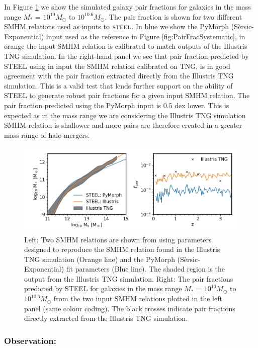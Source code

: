 In Figure \ref{fig:PairFractionIll} we show the simulated galaxy pair fractions for galaxies in the mass range $M_*$ = $10^{10}M_{\odot}$ to $10^{10.6}M_{\odot}$. The pair fraction is shown for two different SMHM relations used as inputs to $\textsc{steel}$. In blue we show the PyMorph (S\`ersic-Exponential) input used as the reference in Figure \ref{fig:PairFracSystematic}, in orange the input SMHM relation is calibrated to match outputs of the Illustris TNG simulation. In the right-hand panel we see that pair fraction predicted by STEEL using in input the SMHM relation calibrated on TNG, is in good agreement with the pair fraction extracted directly from the Illustris TNG simulation. This is a valid test that lends further support on the ability of STEEL to generate robust pair fractions for a given input SMHM relation. The pair fraction predicted using the PyMorph input is 0.5 dex lower. This is expected as in the mass range we are considering the Illustris TNG simulation SMHM relation is shallower and more pairs are therefore created in a greater mass range of halo mergers. 
\begin{figure}
	\centering
	\includegraphics[width = \linewidth]{Figures/Chapter5/PairFractionIllustris.png}
    \caption{Left: Two SMHM relations are shown from \steel using parameters designed to reproduce the SMHM relation found in the Illustris TNG simulation (Orange line) and the PyMorph (S\`ersic-Exponential) fit parameters (Blue line). The shaded region is the output from the Illustris TNG simulation. Right: The pair fractions predicted by STEEL for galaxies in the mass range  $M_*$ = $10^{10}M_{\odot}$ to $10^{10.6}M_{\odot}$  from the two input SMHM relations plotted in the left panel (same colour coding). The black crosses indicate pair fractions directly extracted from the Illustris TNG simulation.}
	\label{fig:PairFractionIll}
\end{figure}

\subsubsection{Observation: \citet{Mundy2017A3.5}}

